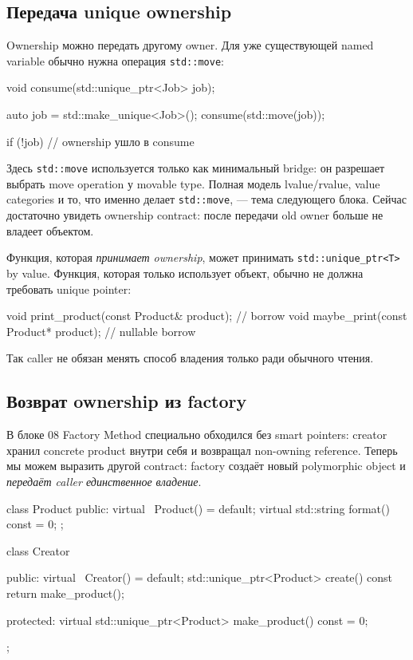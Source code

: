 \subsection{Передача unique ownership}

Ownership можно передать другому owner. Для уже существующей named variable
обычно нужна операция \texttt{std::move}:

\begin{cppcode}
void consume(std::unique_ptr<Job> job);

auto job = std::make_unique<Job>();
consume(std::move(job));

if (!job) {
    // ownership ушло в consume
}
\end{cppcode}

Здесь \texttt{std::move} используется только как минимальный bridge: он
разрешает выбрать move operation у movable type. Полная модель lvalue/rvalue,
value categories и то, что именно делает \texttt{std::move}, --- тема следующего
блока. Сейчас достаточно увидеть ownership contract: после передачи old owner
больше не владеет объектом.

Функция, которая \emph{принимает ownership}, может принимать
\texttt{std::unique\_ptr<T>} by value. Функция, которая только использует объект,
обычно не должна требовать unique pointer:

\begin{cppcode}
void print_product(const Product& product); // borrow
void maybe_print(const Product* product);   // nullable borrow
\end{cppcode}

Так caller не обязан менять способ владения только ради обычного чтения.

\subsection{Возврат ownership из factory}

В блоке 08 Factory Method специально обходился без smart pointers: creator
хранил concrete product внутри себя и возвращал non-owning reference. Теперь
мы можем выразить другой contract: factory создаёт новый polymorphic object и
\emph{передаёт caller единственное владение}.

\begin{cppcode}
class Product {
public:
    virtual ~Product() = default;
    virtual std::string format() const = 0;
};

class Creator {
public:
    virtual ~Creator() = default;
    std::unique_ptr<Product> create() const {
        return make_product();
    }

protected:
    virtual std::unique_ptr<Product> make_product() const = 0;
};
\end{cppcode}

